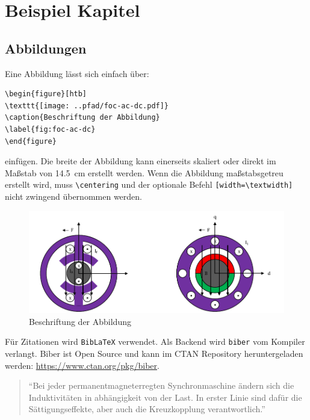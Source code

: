 
\chapter{Beispiel Kapitel}
\label{chap:beispiel-kapitel}

\section{Abbildungen}\label{sec:abbildungen}

Eine Abbildung lässt sich einfach über:

\lstset{language=TeX}
\begin{lstlisting}
\begin{figure}[htb]
\texttt{[image: ..pfad/foc-ac-dc.pdf]}
\caption{Beschriftung der Abbildung}
\label{fig:foc-ac-dc}
\end{figure}
\end{lstlisting}

einfügen.
Die breite der Abbildung kann einerseits skaliert oder direkt im Maßstab von \SI{14.5}{\centi\meter} erstellt werden.
Wenn die Abbildung maßstabsgetreu erstellt wird, muss \verb|\centering| und der optionale Befehl \verb|[width=\textwidth]| nicht zwingend übernommen werden.

\begin{figure}[htb]
	\centering
	\includegraphics[width=\textwidth]{_images/chapter1/foc-dc-ac.pdf}
	\caption{Beschriftung der Abbildung}
	\label{fig:foc-dc-ac}
\end{figure}

Für Zitationen wird \verb|BibLaTeX| verwendet. Als Backend wird \verb|biber| vom Kompiler verlangt.
Biber ist Open Source und kann im CTAN Repository heruntergeladen werden: \url{https://www.ctan.org/pkg/biber}.

\begin{quote}
\enquote{Bei jeder permanentmagneterregten Synchronmaschine ändern sich die Induktivitäten in abhängigkeit von der Last. In erster Linie sind dafür die Sättigungseffekte, aber auch die Kreuzkopplung verantwortlich.} \autocite[S.~2]{ternes2015}
\end{quote}

